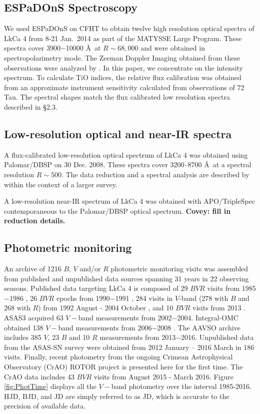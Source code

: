 \documentclass[twocolumn]{emulateapj}%
\newcommand{\name}{LkCa 4 }
\begin{document}
\subsection{ESPaDOnS Spectroscopy}
We used ESPaDOnS on CFHT to obtain twelve high resolution optical spectra of \name from 8-21 Jan.~2014 as part of the MATYSSE Large Program.  These spectra cover 3900$-$10000 \AA\ at $R\sim68,000$ and were obtained in spectropolarimetry mode.  The Zeeman Doppler Imaging obtained from these observations were analyzed by \citet{donati14}.  In this paper, we concentrate on the intensity spectrum.  To calculate TiO indices, the relative flux calibration was obtained from an approximate instrument sensitivity calculated from observations of 72 Tau.  The spectral shapes match the flux calibrated low resolution spectra described in \S 2.3.


\subsection{Low-resolution optical and near-IR spectra}

A flux-calibrated low-resolution optical spectrum of LkCa 4 was obtained using Palomar/DBSP \citep{Oke1982} on 30 Dec. 2008.  These spectra cover 3200--8700 \AA\ at a spectral resolution $R\sim 500$.  The data reduction and a spectral analysis are described by \citet{herczeg14} within the context of a larger survey.

A low-resolution near-IR spectrum of LkCa 4 was obtained with APO/TripleSpec \citep{Wilson04} contemporaneous to the Palomar/DBSP optical spectrum.  {\bf Covey:  fill in reduction details.}


\subsection{Photometric monitoring}

An archive of 1216 $B$, $V$ and/or $R$ photometric monitoring visits was assembled from published and unpublished data sources spanning 31 years in 22 observing seasons.  Published data targeting \name is composed of 29 $BVR$ visits from 1985$-$1986 \citep{vrba93}, 26 $BVR$ epochs from 1990$-$1991 \citep{bouvier93}, 284 visits in $V$-band (278 with $B$ and 268 with $R$) from 1992 August - 2004 October \citep{grankin08}, and 10 $BVR$ visits from 2013 \citep{donati14}.  ASAS3 \citep{pojmanski04} acquired 63 $V-$band measurements from 2002$-$2004.  Integral-OMC obtained 138 $V-$band measurements from 2006$-$2008 \citep{garzon12}.  The AAVSO archive \citep{kafka16} includes 385 $V$, 23 $B$ and 10 $R$ measurements from 2013$-$2016.  Unpublished data from the ASAS-SN survey \citep{shappee14} were obtained from 2012 January -- 2016 March in 186 visits.  Finally, recent photometry from the ongoing Crimean Astrophysical Observatory (CrAO) ROTOR project \citep{grankin08} is presented here for the first time.  The CrAO data includes 43 $BVR$ visits from August 2015 - March 2016. Figure \ref{fig:PhotTime} displays all the $V-$band photometry over the interval 1985-2016.  HJD, BJD, and JD are simply referred to as JD, which is accurate to the precision of available data.
\end{document}
